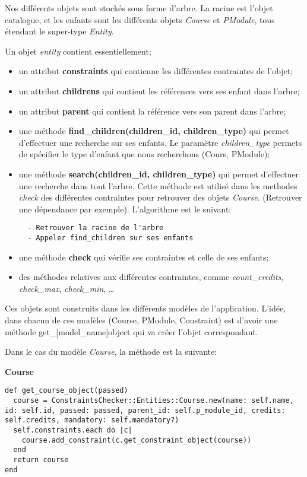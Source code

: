 Nos différents objets sont stockés sous forme d'arbre. La racine est l'objet catalogue, et les enfants sont les différents objets \textit{Course} et \textit{PModule}, tous étendant le super-type \textit{Entity}.

Un objet \textit{entity} contient essentiellement;

\begin{itemize}
  \item un attribut \textbf{constraints} qui contienne les différentes contraintes de l'objet;
  \item un attribut \textbf{childrens} qui contient les références vers ses enfant dans l'arbre;
  \item un attribut \textbf{parent} qui contient la référence vers son parent dans l'arbre;
  \item une méthode \textbf{find\_children(children\_id, children\_type)} qui permet d'effectuer une recherche sur ses enfants. Le paramètre \textit{children\_type} permets de spécifier le type d'enfant que nous recherchons (Cours, PModule);
  \item une méthode \textbf{search(children\_id, children\_type)} qui permet d'effectuer une recherche dans tout l'arbre. Cette méthode est utilisé dans les methodes \textit{check} des différentes contraintes pour retrouver des objets \textit{Course}. (Retrouver une dépendance par exemple). L'algorithme est le suivant;
  \begin{lstlisting}
  - Retrouver la racine de l'arbre
  - Appeler find_children sur ses enfants
  \end{lstlisting}
  \item une méthode \textbf{check} qui vérifie ses contraintes et celle de ses enfants;
  \item des méthodes relatives aux différentes contraintes, comme \textit{count\_credits}, \textit{check\_max}, \textit{check\_min}, \ldots
\end{itemize}

Ces objets sont construits dans les différents modèles de l'application. L'idée, dans chacun de ces modèles (Course, PModule, Constraint) est d'avoir une méthode get\_[model\_name]object qui va créer l'objet correspondant.

Dans le cas du modèle \textit{Course}, la méthode est la suivante:


\textbf{Course}

\begin{lstlisting}
def get_course_object(passed)
  course = ConstraintsChecker::Entities::Course.new(name: self.name, id: self.id, passed: passed, parent_id: self.p_module_id, credits: self.credits, mandatory: self.mandatory?)
  self.constraints.each do |c|
    course.add_constraint(c.get_constraint_object(course))
  end
  return course
end
\end{lstlisting}


